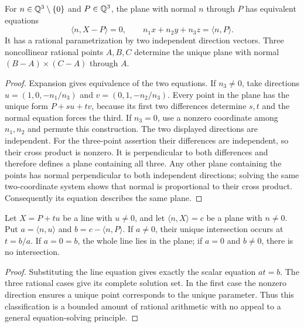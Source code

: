 \begin{theorem}
\label{geo:plane}
For $n\in\mathbb Q^3\setminus\{0\}$ and $P\in\mathbb Q^3$, the plane with normal $n$
through $P$ has equivalent equations
\[
 \langle n,X-P\rangle=0,\qquad
 n_1x+n_2y+n_3z=\langle n,P\rangle.
\]
It has a rational parametrization by two independent direction vectors.
Three noncollinear rational points $A,B,C$ determine the unique plane with
normal $(B-A)\times(C-A)$ through $A$.
\end{theorem}
\begin{proof}
Expansion gives equivalence of the two equations. If $n_3\ne0$, take
directions $u=(1,0,-n_1/n_3)$ and $v=(0,1,-n_2/n_3)$.
Every point in the plane has the unique form $P+su+tv$, because its first
two differences determine $s,t$ and the normal equation forces the third.
If $n_3=0$, use a nonzero coordinate among $n_1,n_2$ and permute this
construction. The two displayed directions are independent.
For the three-point assertion their differences are independent, so their
cross product is nonzero. It is perpendicular to both differences and
therefore defines a plane containing all three. Any other plane containing
the points has normal perpendicular to both independent directions; solving
the same two-coordinate system shows that normal is proportional to their
cross product. Consequently its equation describes the same plane.
\end{proof}

\begin{theorem}
\label{geo:line-plane}
Let $X=P+tu$ be a line with $u\ne0$, and let
$\langle n,X\rangle=c$ be a plane with $n\ne0$.
Put $a=\langle n,u\rangle$ and $b=c-\langle n,P\rangle$.
If $a\ne0$, their unique intersection occurs at $t=b/a$.
If $a=0=b$, the whole line lies in the plane; if $a=0$ and $b\ne0$,
there is no intersection.
\end{theorem}
\begin{proof}
Substituting the line equation gives exactly the scalar equation $at=b$.
The three rational cases give its complete solution set. In the first case
the nonzero direction ensures a unique point corresponds to the unique
parameter. Thus this classification is a bounded amount of rational arithmetic
with no appeal to a general equation-solving principle.
\end{proof}

